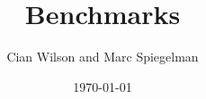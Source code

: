 

\makeatletter
\def\maketitle{%
  \null
  \thispagestyle{empty}%
  \vfill
  \begin{center}\leavevmode
    \normalfont
    {\LARGE\raggedleft \@author\par}%
    \hrulefill\par
    {\huge\raggedright \@title\par}%
    \vfill
    {\Large TerraFERMA Version 1.0\par}%
    {\Large \@date\par}%
  \end{center}%
  \null
  \cleardoublepage
  }
\makeatother
\author{Cian Wilson and Marc Spiegelman }
\title{\TF{} Benchmarks}
\date{\today}


\pagestyle{ruled} %


\setcounter{tocdepth}{2}

\renewcommand{\sc}{}





